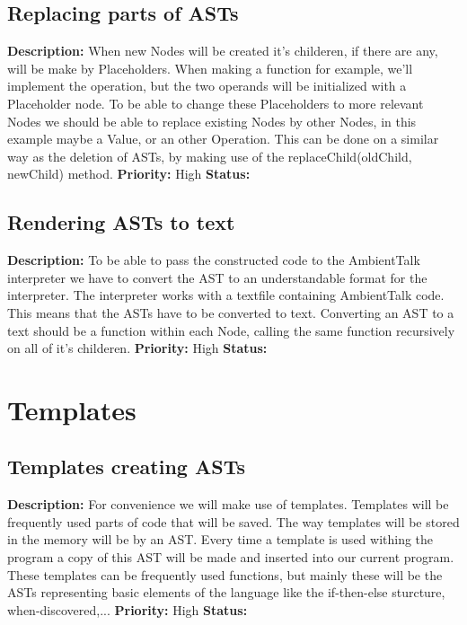 \documentclass[a4paper,12pt]{report}
\begin{document}
\subsection{Replacing parts of ASTs}
\textbf{Description: }When new Nodes will be created it's childeren, if there are any, will be make by Placeholders. When making a function for example, we'll implement the operation,
but the two operands will be initialized with a Placeholder node. To be able to change these Placeholders to more relevant Nodes we should be able to 
replace existing Nodes by other Nodes, in this example maybe a Value, or an other Operation. This can be done on a similar way as the deletion of ASTs, by making use of the replaceChild(oldChild, newChild) method.\newline
\textbf{Priority:} High \newline
\textbf{Status: } \newline
\subsection{Rendering ASTs to text}
\textbf{Description: } To be able to pass the constructed code to the AmbientTalk interpreter we have to convert the AST to an understandable format for the interpreter. The 
interpreter works with a textfile containing AmbientTalk code. This means that the ASTs have to be converted to text. Converting an
AST to a text should be a function within each Node, calling the same function recursively on all of it's childeren.\newline
\textbf{Priority:} High \newline
\textbf{Status: } \newline
\section{Templates} 
\subsection{Templates creating ASTs}
\textbf{Description: } For convenience we will make use of templates. Templates will be frequently used parts of code that will be saved. The way templates will be stored in the 
memory will be by an AST. Every time a template is used withing the program a copy of this AST will be made and inserted into our current program.
These templates can be frequently used functions, but mainly these will be the ASTs representing basic elements of the language like the if-then-else sturcture, when-discovered,...\newline
\textbf{Priority:} High \newline
\textbf{Status: } \newline
\end{document}
